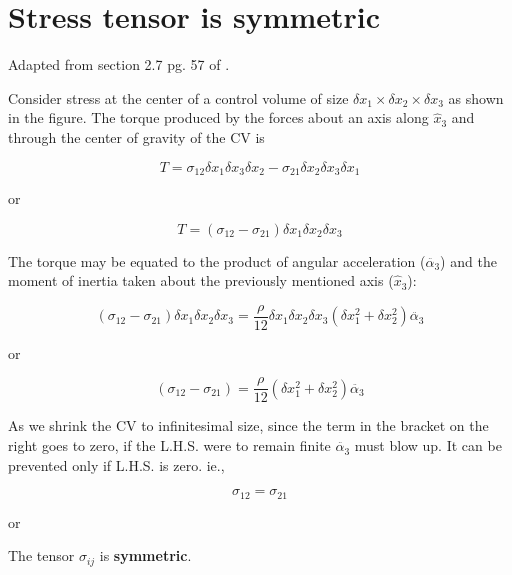 \section{Stress tensor is symmetric}
\label{symstress}

Adapted from section 2.7 pg. 57 of \cite{sabersky}.

Consider stress at the center of a control volume of size $ \delta x_1 \times \delta x_2 \times \delta x_3$ as shown in the figure. The torque produced by the forces about an axis along $\hat{x}_3$ and through the center of gravity of the CV is 

$$ T = \sigma_{12} \delta x_1 \delta x_3 \delta x_2 - \sigma_{21}  \delta x_2 \delta x_3 \delta x_1 $$

or 

$$ T = ( \sigma_{12} - \sigma_{21} ) \delta x_1 \delta x_2 \delta x_3 $$

The torque may be equated to the product of angular acceleration ($\ddot{\alpha_3}$) and the moment of inertia taken about the previously mentioned axis ($\hat{x}_3$):


$$ ( \sigma_{12} - \sigma_{21} ) \delta x_1 \delta x_2 \delta x_3 = \frac{\rho}{12}  \delta x_1 \delta x_2 \delta x_3 (\delta x_1^2 + \delta x_2^2) \ddot{\alpha_3}  $$

or

$$ ( \sigma_{12} - \sigma_{21} ) = \frac{\rho}{12} (\delta x_1^2 + \delta x_2^2) \ddot{\alpha_3}  $$

As we shrink the CV to infinitesimal size, since the term in the bracket on the right goes to zero, if the L.H.S. were to remain finite $\ddot{\alpha_3}$ must blow up. It can be prevented only if L.H.S. is zero. ie., 

$$ \sigma_{12} = \sigma_{21} $$

or

The tensor $\sigma_{ij}$ is {\bf symmetric}.


